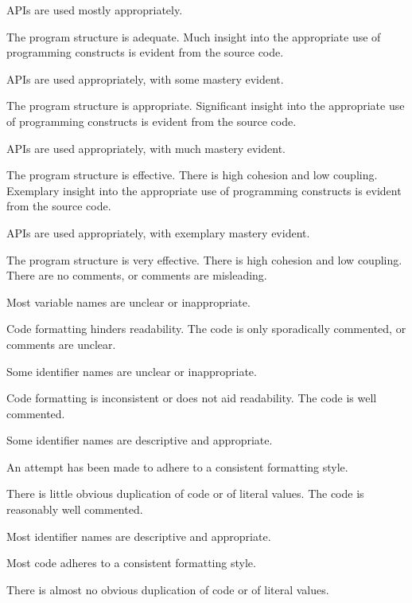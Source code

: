 \documentclass{../fal_assignment}
\begin{document}
\begin{markingrubric}
            \par APIs are used mostly appropriately.
            \par The program structure is adequate.
        \grade Much insight into the appropriate use of programming constructs is evident from the source code.
            \par APIs are used appropriately, with some mastery evident.
            \par The program structure is appropriate.
        \grade Significant insight into the appropriate use of programming constructs is evident from the source code.
            \par APIs are used appropriately, with much mastery evident.
            \par The program structure is effective. There is high cohesion and low coupling.
        \grade Exemplary insight into the appropriate use of programming constructs is evident from the source code.
            \par APIs are used appropriately, with exemplary mastery evident.
            \par The program structure is very effective. There is high cohesion and low coupling.
%
        \grade\fail There are no comments, or comments are misleading.
            \par Most variable names are unclear or inappropriate.
            \par Code formatting hinders readability.
        \grade The code is only sporadically commented, or comments are unclear.
            \par Some identifier names are unclear or inappropriate.
            \par Code formatting is inconsistent or does not aid readability.
        \grade The code is well commented.
            \par Some identifier names are descriptive and appropriate.
            \par An attempt has been made to adhere to a consistent formatting style.
             \par There is little obvious duplication of code or of literal values.           
        \grade The code is reasonably well commented.
            \par Most identifier names are descriptive and appropriate.
            \par Most code adheres to a consistent formatting style.
             \par There is almost no obvious duplication of code or of literal values.   

\end{markingrubric}
\end{document}
